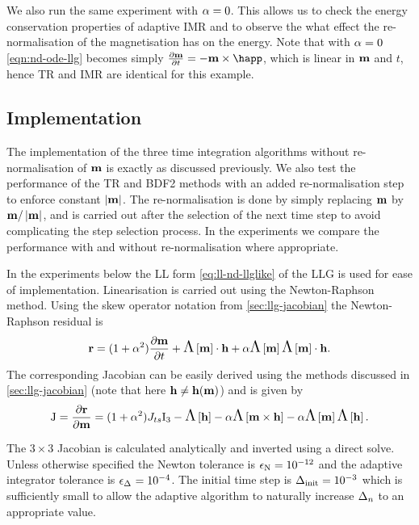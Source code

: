 We also run the same experiment with $\alpha = 0$.
This allows us to check the energy conservation properties of adaptive IMR and to observe the what effect the re-normalisation of the magnetisation has on the energy.
Note that with $\alpha = 0$ \cref{eqn:nd-ode-llg} becomes simply $\dmdt = - \mv \times \happ$, which is linear in $\boldsymbol{\mathrm{m}}$ and $t$, hence TR and IMR are identical for this example.



\subsection{Implementation}

The implementation of the three time integration algorithms without re-normalisation of $\boldsymbol{\mathrm{m}}$ is exactly as discussed previously.
We also test the performance of the TR and BDF2 methods with an added re-normalisation step to enforce constant $\left|{\boldsymbol{\mathrm{m}}} \right|$.
The re-normalisation is done by simply replacing $\boldsymbol{\mathrm{m}}$ by $\boldsymbol{\mathrm{m}}/\left|{\boldsymbol{\mathrm{m}}} \right|$, and is carried out after the selection of the next time step to avoid complicating the step selection process.
In the experiments we compare the performance with and without re-normalisation where appropriate.

In the experiments below the LL form \cref{eq:ll-nd-llglike} of the LLG is used for ease of implementation.
Linearisation is carried out using the Newton-Raphson method.
Using the skew operator notation from \cref{sec:llg-jacobian} the Newton-Raphson residual is
\begin{equation}
  \boldsymbol{\mathrm{r}} = (1 + \alpha^2) \frac{\partial \boldsymbol{\mathrm{m}}}{\partial t} + \text{\Large{$\Lambda$}}\left[ \boldsymbol{\mathrm{m}} \right] \cdot \boldsymbol{\mathrm{h}} + \alpha \text{\Large{$\Lambda$}}\left[ \boldsymbol{\mathrm{m}} \right]\text{\Large{$\Lambda$}}\left[ \boldsymbol{\mathrm{m}} \right] \cdot \boldsymbol{\mathrm{h}}.
\end{equation}
The corresponding Jacobian can be easily derived using the methods discussed in \cref{sec:llg-jacobian} (note that here $\boldsymbol{\mathrm{h}} \neq \boldsymbol{\mathrm{h}}(\boldsymbol{\mathrm{m}})$) and is given by
\begin{equation}
  \mathrm{J} = \frac{\partial \boldsymbol{\mathrm{r}}}{\partial \boldsymbol{\mathrm{m}}} = (1 + \alpha^2) J_{ts} \mathrm{I}_3 - \text{\Large{$\Lambda$}}\left[ \boldsymbol{\mathrm{h}} \right] - \alpha \text{\Large{$\Lambda$}}\left[  \boldsymbol{\mathrm{m}} \times \boldsymbol{\mathrm{h}}  \right]
  - \alpha \text{\Large{$\Lambda$}}\left[ \boldsymbol{\mathrm{m}} \right] \text{\Large{$\Lambda$}}\left[ \boldsymbol{\mathrm{h}} \right].
\end{equation}

The $3 \times 3$ Jacobian is calculated analytically and inverted using a direct solve.
Unless otherwise specified the Newton tolerance is $\epsilon_{\mathrm{N}} = 10^{-12}$ and the adaptive integrator tolerance is $\epsilon_{\Delta_{}} = 10^{-4}$.
The initial time step is $\Delta_{\mathrm{init}} = 10^{-3}$ which is sufficiently small to allow the adaptive algorithm to naturally increase $\Delta_{n}$ to an appropriate value.


